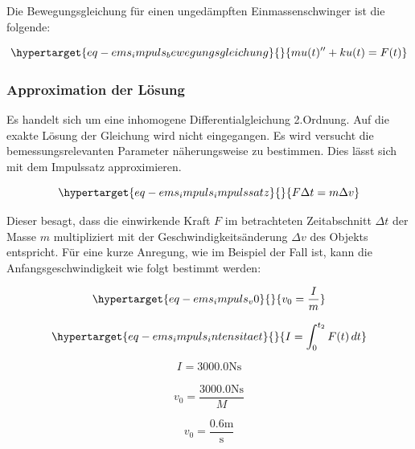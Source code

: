 \documentclass[
  letterpaper,
  DIV=11]{scrreprt}
\begin{document}
Die Bewegungsgleichung für einen ungedämpften Einmassenschwinger ist die
folgende:

\begin{equation}\protect\hypertarget{eq-ems_impuls_bewegungsgleichung}{}{
m u(t)'' + k u(t) = F(t)
}\label{eq-ems_impuls_bewegungsgleichung}\end{equation}

\hypertarget{approximation-der-luxf6sung}{%
\subsubsection{Approximation der
Lösung}\label{approximation-der-luxf6sung}}

Es handelt sich um eine inhomogene Differentialgleichung 2.Ordnung. Auf
die exakte Lösung der Gleichung wird nicht eingegangen. Es wird versucht
die bemessungsrelevanten Parameter näherungsweise zu bestimmen. Dies
lässt sich mit dem Impulssatz approximieren.

\begin{equation}\protect\hypertarget{eq-ems_impuls_impulssatz}{}{
F \Delta t = m \Delta v
}\label{eq-ems_impuls_impulssatz}\end{equation}

Dieser besagt, dass die einwirkende Kraft \(F\) im betrachteten
Zeitabschnitt \(\Delta t\) der Masse \(m\) multipliziert mit der
Geschwindigkeitsänderung \(\Delta v\) des Objekts entspricht. Für eine
kurze Anregung, wie im Beispiel der Fall ist, kann die
Anfangsgeschwindigkeit wie folgt bestimmt werden:

\begin{equation}\protect\hypertarget{eq-ems_impuls_v0}{}{
v_0 = \frac{I}{m}
}\label{eq-ems_impuls_v0}\end{equation}

\begin{equation}\protect\hypertarget{eq-ems_impuls_intensitaet}{}{
I = \int_{0}^{t_2} F(t) \,dt
}\label{eq-ems_impuls_intensitaet}\end{equation}

\begin{equation}I_{} = 3000.0 \text{N} \text{s}\end{equation}

\begin{equation}v_{0} = \frac{3000.0 \text{N} \text{s}}{M}\end{equation}

\begin{equation}v_{0} = \frac{0.6 \text{m}}{\text{s}}\end{equation}
\end{document}
